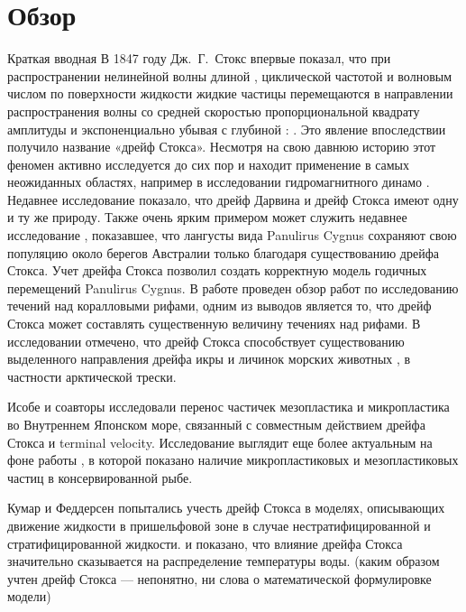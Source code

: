 \chapter{Обзор} \label{ch:ch1}

Краткая вводная
В 1847 году Дж.~Г.~Стокс \cite{Stokes} впервые показал, что при распространении нелинейной волны длиной  , циклической частотой   и волновым числом   по поверхности жидкости жидкие частицы перемещаются в направлении распространения волны со средней скоростью пропорциональной квадрату амплитуды   и экспоненциально убывая с глубиной  :
.
Это явление впоследствии получило название «дрейф Стокса». Несмотря на свою давнюю историю этот феномен активно исследуется до сих пор и находит применение в самых неожиданных областях, например в исследовании гидромагнитного динамо \cite{herreman2011stokes}. Недавнее исследование \cite{eames1999connection} показало, что дрейф Дарвина \cite{darwin1953note} и дрейф Стокса имеют одну и ту же природу. Также очень ярким примером может служить недавнее исследование \cite{feng2010ocean}, показавшее, что лангусты вида Panulirus Cygnus сохраняют свою популяцию около берегов Австралии только благодаря существованию дрейфа Стокса. Учет дрейфа Стокса позволил создать корректную модель годичных перемещений Panulirus Cygnus. В работе \cite{monismith2007hydrodynamics} проведен обзор работ по исследованию течений над коралловыми рифами, одним из выводов является то, что дрейф Стокса может составлять существенную величину течениях над рифами. В исследовании \cite{rohrs2014wave} отмечено, что дрейф Стокса способствует существованию выделенного направления дрейфа икры и личинок морских животных , в частности арктической трески.

Исобе и соавторы \cite{isobe2014selective} исследовали перенос частичек мезопластика и микропластика во Внутреннем Японском море, связанный с совместным действием дрейфа Стокса и terminal velocity. Исследование выглядит еще более актуальным на фоне работы \cite{karami2018microplastic}, в которой показано наличие микропластиковых и мезопластиковых частиц в консервированной рыбе.

Кумар и Феддерсен попытались учесть дрейф Стокса в моделях, описывающих движение жидкости в пришельфовой зоне в случае нестратифицированной \cite{kumar2017effect} и стратифицированной \cite{kumar2017effectb} жидкости. и показано, что влияние дрейфа Стокса значительно сказывается на распределение температуры воды. (каким образом учтен дрейф Стокса --- непонятно, ни слова о математической формулировке модели)

